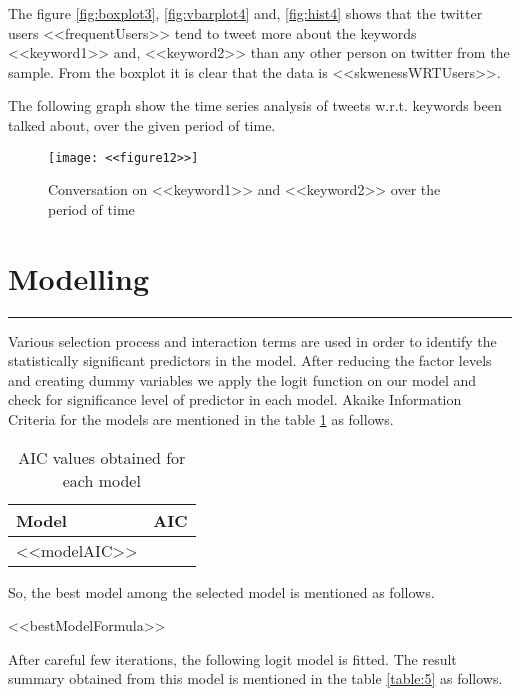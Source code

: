 \documentclass[a4paper,12pt, notitlepage]{article}
\begin{document}
\par
The figure \ref{fig:boxplot3}, \ref{fig:vbarplot4} and, \ref{fig:hist4} shows that the twitter users <<frequentUsers>> tend to tweet more about the keywords <<keyword1>> and, <<keyword2>> than any other person on twitter from the sample. From the boxplot it is clear that the data is <<skwenessWRTUsers>>.

\par
The following graph show the time series analysis of tweets w.r.t. keywords been talked about, over the given period of time.

\begin{figure}[!htbp]
    \centering
    \texttt{[image: <<figure12>>]}
    \caption{Conversation on <<keyword1>> and <<keyword2>> over the period of time}
    \label{fig:timeseries1}
\end{figure}

\section{Modelling}
\rule{\textwidth}{0.5pt}
\par
Various selection process and interaction terms are used in order to identify the statistically significant predictors in the model. After reducing the factor levels and creating dummy variables we apply the logit function on our model and check for significance level of predictor in each model. Akaike Information Criteria for the models are mentioned in the table \ref{table:4} as follows.

\begin{table}[!htbp]
\centering
\begin{tabular}{ |l|r| }
\hline \rowcolor{Gray}
Model & AIC   \\
\hline
<<modelAIC>>
\hline
\end{tabular}
\caption{AIC	values obtained for each model}
\label{table:4}
\end{table}

\par
So, the best model among the selected model is mentioned as follows.

\begin{mdframed}[hidealllines=true,backgroundcolor=gray!20]
<<bestModelFormula>>
\end{mdframed}

\par
After careful few iterations, the following logit model is fitted. The result summary obtained from this model is mentioned in the table \ref{table:5} as follows.
\end{document}
